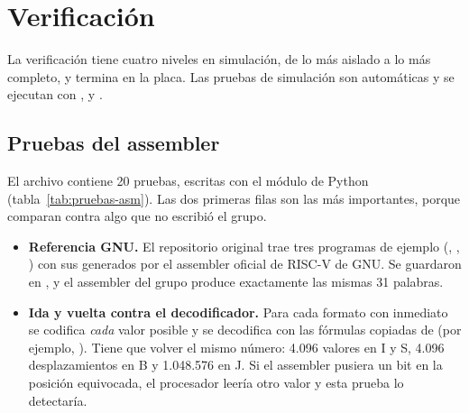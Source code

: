\section{Verificación}
\label{sec:verificacion}

La verificación tiene cuatro niveles en simulación, de lo más aislado a lo más completo,
y termina en la placa. Las pruebas de simulación son automáticas y se ejecutan con
,  y .

\subsection{Pruebas del assembler}

El archivo  contiene 20 pruebas, escritas con el módulo
 de Python (tabla~\ref{tab:pruebas-asm}). Las dos primeras filas son las
más importantes, porque comparan contra algo que no escribió el grupo.

\begin{itemize}
  \item \textbf{Referencia GNU.} El repositorio original trae tres programas de ejemplo
        (, , ) con sus 
        generados por el assembler oficial de RISC-V de GNU. Se guardaron en
        , y el assembler del grupo produce exactamente las mismas 31
        palabras.
  \item \textbf{Ida y vuelta contra el decodificador.} Para cada formato con inmediato
        se codifica \emph{cada} valor posible y se decodifica con las fórmulas copiadas
        de  (por ejemplo,
        ). Tiene
        que volver el mismo número: 4.096 valores en I y S, 4.096 desplazamientos en B y
        1.048.576 en J. Si el assembler pusiera un bit en la posición equivocada, el
        procesador leería otro valor y esta prueba lo detectaría.
\end{itemize}

